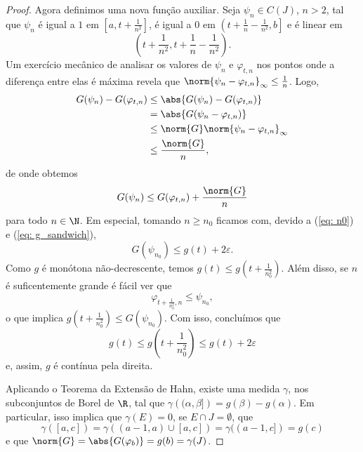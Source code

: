 \begin{proof}
    Agora definimos uma nova função auxiliar.
    Seja \( \psi_{ n } \in C(J) \), \( n > 2 \), tal que \( \psi_{ n } \) é igual a \( 1 \) em \( \left[a, t + \frac{ 1 }{ n^2 }\right] \), é igual a \( 0 \) em \( \left(t + \frac{ 1 }{ n } - \frac{ 1 }{ n^2 }, b\right] \) e é linear em \[
        \left(t + \frac{ 1 }{ n^2 }, t + \frac{ 1 }{ n } - \frac{ 1 }{ n^2 }\right)
    .\]
    Um exercício mecânico de analisar os valores de \( \psi_{ n } \) e \( \varphi_{ t, n } \) nos pontos onde a diferença entre elas é máxima revela que \( \norm{ \psi_{ n } - \varphi_{ t, n } }_{ \infty } \leq \frac{ 1 }{ n } \).
    Logo,
    \begin{align*}
        G(\psi_{ n }) - G(\varphi_{ t, n })
        &\leq\abs{ G(\psi_{ n }) - G(\varphi_{ t, n }) } \\
        &= \abs{ G(\psi_{ n } - \varphi_{ t, n }) } \\
        &\leq \norm{ G } \norm{ \psi_{ n } - \varphi_{ t, n } }_{ \infty } \\
        &\leq \frac{ \norm{ G } }{ n }
    ,\end{align*}
    de onde obtemos \[
        G(\psi_{ n }) \leq G(\varphi_{ t, n }) + \frac{ \norm{ G } }{ n }
    \]
    para todo \( n \in \N \).
    Em especial, tomando \( n \geq n_{ 0 } \) ficamos com, devido a (\ref{eq: n0}) e (\ref{eq: g_sandwich}), \[
        G(\psi_{ n_{ 0 } }) \leq g(t) + 2 \varepsilon
    .\]
    Como \( g \) é monótona não-decrescente, temos \( g(t) \leq g \left(t + \frac{ 1 }{ n_{ 0 }^2 } \right) \).
    Além disso, se \( n \) é suficentemente grande é fácil ver que \[
        \varphi_{ t + \frac{ 1 }{ n_{ 0 }^2 }, n } \leq \psi_{ n_{ 0 } }
    ,\]
    o que implica \( g \left( t + \frac{ 1 }{ n_{ 0 }^2 } \right) \leq G(\psi_{ n_{ 0 } }) \).
    Com isso, concluímos que \[
        g(t) \leq g \left( t + \frac{ 1 }{ n_{ 0 }^2 } \right) \leq g(t) + 2 \varepsilon
    \]
    e, assim, \( g \) é contínua pela direita.

    Aplicando o Teorema da Extensão de Hahn, existe uma medida \( \gamma \), nos subconjuntos de Borel de \( \R \), tal que \( \gamma \left((\alpha, \beta]\right) = g(\beta) - g(\alpha) \).
    Em particular, isso implica que \( \gamma(E) = 0 \), se \( E \cap J = \emptyset \), que \[
        \gamma ([a, c]) = \gamma((a-1, a) \cup [a, c]) = \gamma((a-1, c]) = g(c)
    \]
    e que \( \norm{ G } = \abs{ G(\varphi_{ b }) } = g(b) = \gamma(J) \).


\end{proof}
